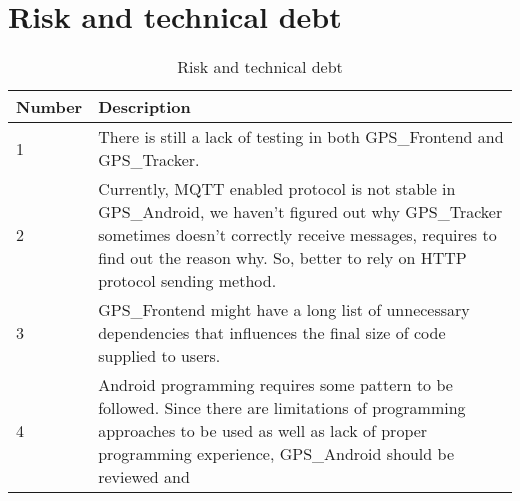 
\newpage
\section{Risk and technical debt}\label{risk-and-technical-debt}

\begin{longtable}[]{@{}ll@{}}
\caption{Risk and technical debt}\tabularnewline
\toprule
\begin{minipage}[b]{0.1\columnwidth}\raggedright
Number\strut
\end{minipage} & \begin{minipage}[b]{0.8\columnwidth}\raggedright
Description\strut
\end{minipage}\tabularnewline
\midrule
\endhead
\begin{minipage}[t]{0.1\columnwidth}\raggedright
1\strut
\end{minipage} & \begin{minipage}[t]{0.8\columnwidth}\raggedright
There is still a lack of testing in both GPS\_Frontend and
GPS\_Tracker.\strut
\end{minipage}\tabularnewline
\begin{minipage}[t]{0.1\columnwidth}\raggedright
2\strut
\end{minipage} & \begin{minipage}[t]{0.8\columnwidth}\raggedright
Currently, MQTT enabled protocol is not stable in GPS\_Android, we
haven't figured out why GPS\_Tracker sometimes doesn't correctly receive
messages, requires to find out the reason why. So, better to rely on
HTTP protocol sending method.\strut
\end{minipage}\tabularnewline
\begin{minipage}[t]{0.1\columnwidth}\raggedright
3\strut
\end{minipage} & \begin{minipage}[t]{0.8\columnwidth}\raggedright
GPS\_Frontend might have a long list of unnecessary dependencies that
influences the final size of code supplied to users.\strut
\end{minipage}\tabularnewline
\begin{minipage}[t]{0.1\columnwidth}\raggedright
4\strut
\end{minipage} & \begin{minipage}[t]{0.8\columnwidth}\raggedright
Android programming requires some pattern to be followed. Since there
are limitations of programming approaches to be used as well as lack of
proper programming experience, GPS\_Android should be reviewed and

\end{minipage}
\end{longtable}

